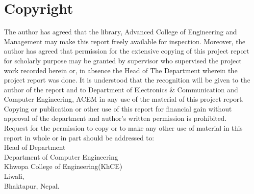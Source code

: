 			\chapter*{Copyright}
		\normalsize
		\justify
		The author has agreed that the library, Advanced College of Engineering and
Management may make this report freely available for inspection. Moreover, the author
has agreed that permission for the extensive copying of this project report for scholarly
purpose may be granted by supervisor who supervised the project work recorded herein
or, in absence the Head of The Department wherein the project report was done. It is
understood that the recognition will be given to the author of the report and to
Department of Electronics & Communication and Computer Engineering, ACEM in
any use of the material of this project report. Copying or publication or other use of this
report for financial gain without approval of the department and author’s written
permission is prohibited. Request for the permission to copy or to make any other use
of material in this report in whole or in part should be addressed to:
\vspace{1.5cm}\\
Head of Department\\
Department of Computer Engineering\\
Khwopa College of Engineering(KhCE)\\
Liwali,\\
Bhaktapur, Nepal.\\
		\break

	
		\large

